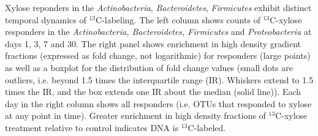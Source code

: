 Xylose reponders in the \textit{Actinobacteria}, \textit{Bacteroidetes},
\textit{Firmicutes} exhibit distinct temporal dynamics of $^{13}$C-labeling.
The left column shows counts of $^{13}$C-xylose responders in the
\textit{Actinobacteria, Bacteroidetes, Firmicutes} and \textit{Proteobacteria}
at days 1, 3, 7 and 30. The right panel shows enrichment in high density
gradient fractions (expressed as fold change, not logarithmic) for responders
(large points) as well as a boxplot for the distribution of fold change values
(small dots are outliers, i.e. beyond 1.5 times the interquartile range (IR).
Whiskers extend to 1.5 times the IR, and the box extends one IR about the
median (solid line)). Each day in the right column shows all responders (i.e.
OTUs that responded to xylose at any point in time). Greater enrichment in high
density fractions of $^{13}$C-xylose treatment relative to control indicates
DNA is $^{13}$C-labeled.
    
